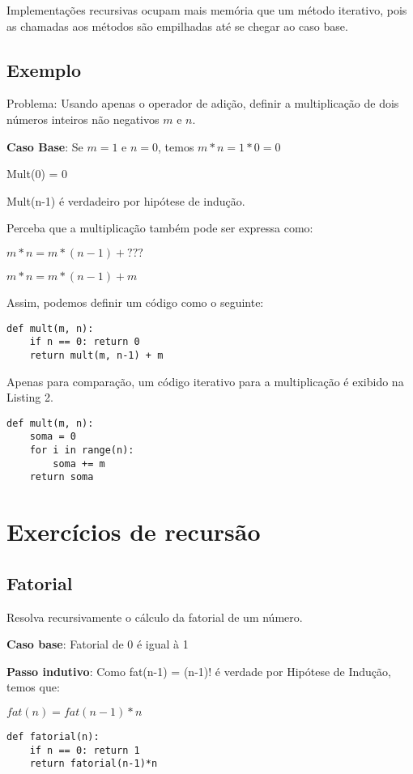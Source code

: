 \documentclass[a4paper, twocolumn]{article}
\theoremstyle{definition}
\begin{document}
Implementações recursivas ocupam mais memória que um método iterativo, pois as chamadas aos métodos são empilhadas até se chegar ao caso base.

\subsection{Exemplo}
Problema: Usando apenas o operador de adição, definir a multiplicação de dois números inteiros não negativos $m$ e $n$.

\textbf{Caso Base}: Se $m=1$ e $n=0$, temos $m*n = 1*0 = 0$

Mult(0) = 0

Mult(n-1) é verdadeiro por hipótese de indução.

Perceba que a multiplicação também pode ser expressa como:

$m*n = m*(n-1) + ???$

$m*n = m*(n-1) + m$

Assim, podemos definir um código como o seguinte:

\begin{lstlisting}[label=mult_rec,caption= Multiplicação recursiva]
def mult(m, n):
	if n == 0: return 0
	return mult(m, n-1) + m
\end{lstlisting}

Apenas para comparação, um código iterativo para a multiplicação é exibido na Listing 2.
\begin{lstlisting}[label=mult_iter,caption= Multiplicação iterativa]
def mult(m, n):
	soma = 0	
	for i in range(n):
		soma += m
	return soma
\end{lstlisting}

\section{Exercícios de recursão}
\subsection{Fatorial}
Resolva recursivamente o cálculo da fatorial de um número.

\textbf{Caso base}: Fatorial de 0 é igual à 1

\textbf{Passo indutivo}: Como fat(n-1) = (n-1)! é verdade por Hipótese de Indução, temos que:

$fat(n) = fat(n-1)*n$

\begin{lstlisting}[label=fatorial,caption= Fatorial recursiva]
def fatorial(n):
	if n == 0: return 1
	return fatorial(n-1)*n
\end{lstlisting}
\end{document}
